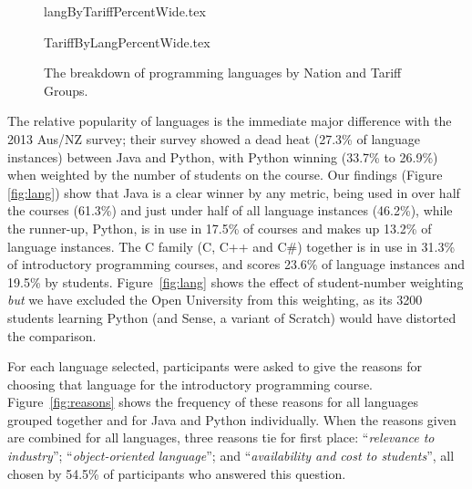 \documentclass[a4paper,11pt]{article}
\begin{document}
\begin{figure}[ht]
\begin{center}
{langByTariffPercentWide.tex}
\end{center}%
%
\begin{center}
{TariffByLangPercentWide.tex}
\end{center}
\caption{The breakdown of programming languages by Nation and Tariff Groups.\label{fig;LangTariff}}
\end{figure}

The relative popularity of languages is the immediate major difference
with the 2013 Aus/NZ survey; their survey showed a dead heat (27.3\%
of language instances) between Java and Python, with Python winning
(33.7\% to 26.9\%) when weighted by the number of students on the
course.  Our findings (Figure \ref{fig:lang}) show that Java is a
clear winner by any metric, being used in over half the courses
(61.3\%) and just under half of all language instances (46.2\%), while
the runner-up, Python, is in use in 17.5\% of courses and makes up
13.2\% of language instances. The C family (C, C++ and C\#) together
is in use in 31.3\% of introductory programming courses, and scores
23.6\% of language instances and 19.5\% by
students. Figure~\ref{fig:lang} shows the effect of student-number
weighting \emph{but} we have excluded the Open University from this
weighting, as its 3200 students learning Python (and Sense, a variant
of Scratch) would have distorted the comparison.

For each language selected, participants were asked to give the
reasons for choosing that language for the introductory programming
course. Figure~\ref{fig:reasons} shows the frequency of these reasons
for all languages grouped together and for Java and Python
individually. When the reasons given are combined for all languages,
three reasons tie for first place: ``{\emph{relevance to industry}}'';
``{\emph{object-oriented language}}''; and ``{\emph{availability and
cost to students}}'', all chosen by 54.5\% of participants who
answered this question.
\end{document}
